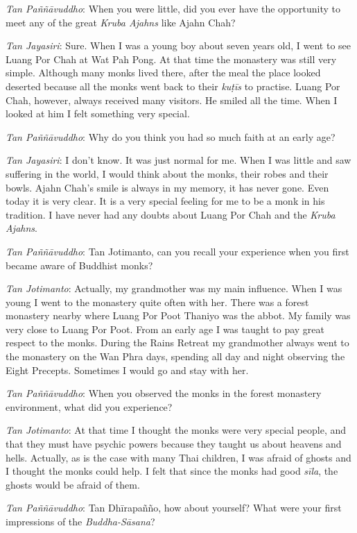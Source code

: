 \emph{Tan Paññāvuddho}: When you were little, did you ever have the
opportunity to meet any of the great \emph{Kruba Ajahns} like Ajahn
Chah? 

\emph{Tan Jayasiri}: Sure. When I was a young boy about seven years old, 
I went to see Luang Por Chah at Wat Pah Pong. At that time the monastery
was still very simple. Although many monks lived there, after the meal
the place looked deserted because all the monks went back to their
\emph{kuṭīs} to practise. Luang Por Chah, however, always received many
visitors. He smiled all the time. When I looked at him I felt something
very special. 

\emph{Tan Paññāvuddho}: Why do you think you had so much faith at an
early age? 

\emph{Tan Jayasiri}: I don't know. It was just normal for me. When I was
little and saw suffering in the world, I would think about the monks, 
their robes and their bowls. Ajahn Chah's smile is always in my memory, 
it has never gone. Even today it is very clear. It is a very special
feeling for me to be a monk in his tradition. I have never had any
doubts about Luang Por Chah and the \emph{Kruba Ajahns}.

\emph{Tan Paññāvuddho}: Tan Jotimanto, can you recall your experience
when you first became aware of Buddhist monks? 

\emph{Tan Jotimanto}: Actually, my grandmother was my main influence. 
When I was young I went to the monastery quite often with her. There was
a forest monastery nearby where Luang Por Poot Thaniyo was the abbot. My
family was very close to Luang Por Poot. From an early age I was taught
to pay great respect to the monks. During the Rains Retreat my
grandmother always went to the monastery on the Wan Phra days, spending
all day and night observing the Eight Precepts. Sometimes I would go and
stay with her. 

\emph{Tan Paññāvuddho}: When you observed the monks in the forest
monastery environment, what did you experience? 

\emph{Tan Jotimanto}: At that time I thought the monks were very special
people, and that they must have psychic powers because they taught us
about heavens and hells. Actually, as is the case with many Thai
children, I was afraid of ghosts and I thought the monks could help. I
felt that since the monks had good \emph{sīla}, the ghosts would be
afraid of them. 

\emph{Tan Paññāvuddho}: Tan Dhīrapañño, how about yourself? What were
your first impressions of the \emph{Buddha-Sāsana}?

